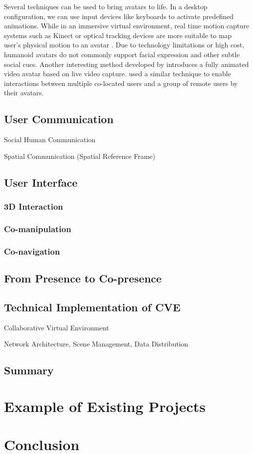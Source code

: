 Several techniques can be used to bring avatars to life. In a desktop configuration, we can use input devices like keyboards to activate predefined animations. While in an immersive virtual environment, real time motion capture systems such as Kinect or optical tracking devices are more suitable to map user's physical motion to an avatar \citep{Mohler2010Effect, Vera2011AugMir, Normand2012FBA}. Due to technology limitations or high cost, humanoid avatars do not commonly support facial expression and other subtle social cues. Another interesting method developed by \citet{Ogi2001SteAva} introduces a fully animated video avatar based on live video capture. \citet{Beck2013IGG} used a similar technique to enable interactions between multiple co-located users and a group of remote users by their avatars.

\subsection{User Communication}
Social Human Communication

Spatial Communication (Spatial Reference Frame)

\subsection{User Interface}
\subsubsection{3D Interaction}
\subsubsection{Co-manipulation}
\subsubsection{Co-navigation}

\subsection{From Presence to Co-presence}



\subsection{Technical Implementation of CVE}
Collaborative Virtual Environment

Network Architecture, Scene Management, Data Distribution

\subsection{Summary}

\section{Example of Existing Projects}


\section{Conclusion}

